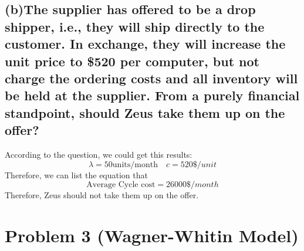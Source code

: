 \documentclass[a4paper,12pt]{journal}
\begin{document}
	\subsection*{(b)The supplier has offered to be a drop shipper, i.e., they will ship directly to the customer. In exchange, they will increase the unit price to \$520 per computer, but not charge the ordering costs and all inventory will be held at the supplier. From a purely financial standpoint, should Zeus take them up on the offer?}
	According to the question, we could get this results:
	\begin{equation}
			\lambda=50\text{units/month}\quad c=520\$/unit
	\end{equation}
	Therefore, we can list the equation that 
	\begin{equation}
		\text{Average Cycle cost}=26000\$/month
	\end{equation}
	Therefore, Zeus should not take them up on the offer.
	\section*{Problem 3 (Wagner-Whitin Model)}
\end{document}
